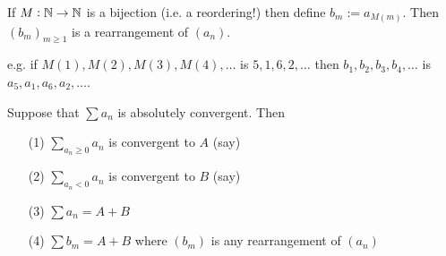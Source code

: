 \begin{definition} 
	If $M: \mathbb{N} \to \mathbb{N}$ is a bijection (i.e. a reordering!) then define $b_m:= a_{M(m)}.$ Then $(b_m)_{m \geq 1}$ is a rearrangement of $(a_n)$.
\end{definition}

e.g. if $M(1), M(2), M(3), M(4),\dots$ is $5,1,6,2,\dots$ then $b_1,b_2,b_3,b_4,\dots$ is $a_5,a_1,a_6,a_2,\dots$.\\


\begin{theorem}
Suppose that $\sum a_n$ is absolutely convergent. Then
\begin{itemize}
\item[(1)] $\sum_{a_n \geq 0} a_n$ is convergent to $A$ (say)	
\item[(2)] $\sum_{a_n < 0} a_n$ is convergent to $B$ (say)	
\item[(3)] $\sum a_n = A+B$
\item[(4)] $\sum b_m = A+B$ where $(b_m)$ is any rearrangement of $(a_n)$
\end{itemize}
\end{theorem}

